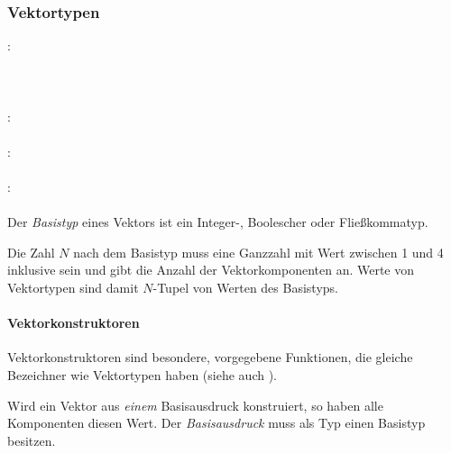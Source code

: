 \subsubsection{Vektortypen}\label{Vektortypen}
:\label{typ_vektor}\\
\hspace*{1cm} \\
\hspace*{1cm} \\
\hspace*{1cm} \\
:\label{typ_vektor_int}\\
\hspace*{1cm}\Gspace{}\\
:\label{typ_vektor_float}\\
\hspace*{1cm}\\
:\label{typ_vektor_bool}\\
\hspace*{1cm}\\



Der \emph{Basistyp} eines Vektors ist ein Integer-, Boolescher oder Fließkommatyp.

Die Zahl $N$ nach dem Basistyp muss eine Ganzzahl mit Wert zwischen 1 und 4 inklusive sein und gibt die Anzahl der Vektorkomponenten an.
Werte von Vektortypen sind damit $N$-Tupel von Werten des Basistyps.

\paragraph{Vektorkonstruktoren}\label{Vektorkonstruktoren}

Vektorkonstruktoren sind besondere, vorgegebene Funktionen, die gleiche Bezeichner wie Vektortypen haben
(siehe auch ).

Wird ein Vektor aus \emph{einem} Basisausdruck konstruiert, so haben alle Komponenten diesen Wert.
Der \emph{Basisausdruck} muss als Typ einen Basistyp besitzen.

